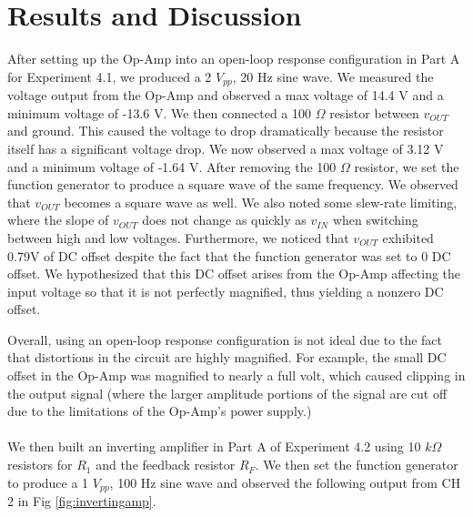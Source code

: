 \documentclass[10pt]{article}
\begin{document}
\section{Results and Discussion}

\qquad After setting up the Op-Amp into an open-loop response configuration in Part A for Experiment 4.1, we produced a 2 $V_{pp}$, 20 Hz sine wave. We measured the voltage output from the Op-Amp and observed a max voltage of 14.4 V and a minimum voltage of -13.6 V. We then connected a 100 $\Omega$ resistor between $v_{OUT}$ and ground. This caused the voltage to drop dramatically because the resistor itself has a significant voltage drop. We now observed a max voltage of 3.12 V and a minimum voltage of -1.64 V. After removing the 100 $\Omega$ resistor, we set the function generator to produce a square wave of the same frequency. We observed that $v_{OUT}$ becomes a square wave as well. We also noted some slew-rate limiting, where the slope of $v_{OUT}$ does not change as quickly as $v_{IN}$ when switching between high and low voltages. Furthermore, we noticed that $v_{OUT}$ exhibited 0.79V of DC offset despite the fact that the function generator was set to 0 DC offset. We hypothesized that this DC offset arises from the Op-Amp affecting the input voltage so that it is not perfectly magnified, thus yielding a nonzero DC offset. 

\quad Overall, using an open-loop response configuration is not ideal due to the fact that distortions in the circuit are highly magnified. For example, the small DC offset in the Op-Amp was magnified to nearly a full volt, which caused clipping in the output signal (where the larger amplitude portions of the signal are cut off due to the limitations of the Op-Amp's power supply.)\\\\

\quad We then built an inverting amplifier in Part A of Experiment 4.2 using 10 $k\Omega$ resistors for $R_1$ and the feedback resistor $R_F$. We then set the function generator to produce a 1 $V_{pp}$, 100 Hz sine wave and observed the following output from CH 2 in Fig \ref{fig:invertingamp}. 
\end{document}

